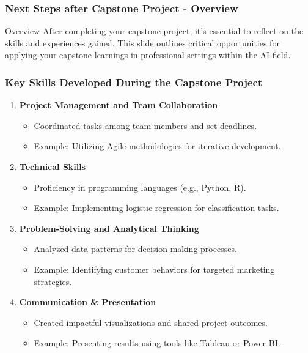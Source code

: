 \documentclass[aspectratio=169]{beamer}
\begin{document}
\begin{frame}[fragile]
  \frametitle{Next Steps after Capstone Project - Overview}
  \begin{block}{Overview}
    After completing your capstone project, it's essential to reflect on the skills and experiences gained. This slide outlines critical opportunities for applying your capstone learnings in professional settings within the AI field.
  \end{block}
\end{frame}

\begin{frame}[fragile]
  \frametitle{Key Skills Developed During the Capstone Project}
  \begin{enumerate}
    \item \textbf{Project Management and Team Collaboration}
      \begin{itemize}
        \item Coordinated tasks among team members and set deadlines.
        \item Example: Utilizing Agile methodologies for iterative development.
      \end{itemize}
    \item \textbf{Technical Skills}
      \begin{itemize}
        \item Proficiency in programming languages (e.g., Python, R).
        \item Example: Implementing logistic regression for classification tasks.
      \end{itemize}
    \item \textbf{Problem-Solving and Analytical Thinking}
      \begin{itemize}
        \item Analyzed data patterns for decision-making processes.
        \item Example: Identifying customer behaviors for targeted marketing strategies.
      \end{itemize}
    \item \textbf{Communication \& Presentation}
      \begin{itemize}
        \item Created impactful visualizations and shared project outcomes.
        \item Example: Presenting results using tools like Tableau or Power BI.
      \end{itemize}
  \end{enumerate}
\end{frame}
\end{document}
